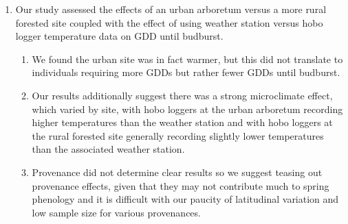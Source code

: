 \documentclass{article}\usepackage[]{graphicx}\usepackage[]{color}
\begin{document}
\begin{enumerate}
\begin{enumerate} 
\item Our study assessed the effects of an urban arboretum versus a more rural forested site coupled with the effect of using weather station versus hobo logger temperature data on GDD until budburst.
  \begin{enumerate} 
  \item We found the urban site was in fact warmer, but this did not translate to individuals requiring more GDDs but rather fewer GDDs until budburst.
  \item Our results additionally suggest there was a strong microclimate effect, which varied by site, with hobo loggers at the urban arboretum recording higher temperatures than the weather station and with hobo loggers at the rural forested site generally recording slightly lower temperatures than the associated weather station.
  \item Provenance did not determine clear results so we suggest teasing out provenance effects, given that they may not contribute much to spring phenology \citep{Gauzere2017} and it is difficult with our paucity of latitudinal variation and low sample size for various provenances. 
  \end{enumerate}
  \end{enumerate}


\end{enumerate}
\end{document}
